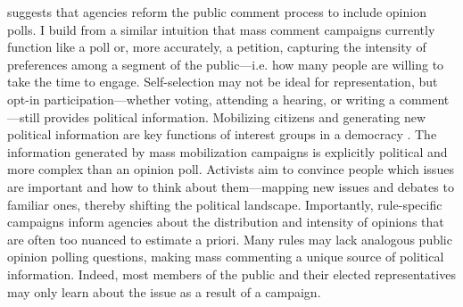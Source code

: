 \citet{Rauch2016} suggests that agencies reform the public comment process to include opinion polls. I build from a similar intuition that mass comment campaigns currently function like a poll or, more accurately, a petition, capturing the intensity of preferences among a segment of the public---i.e. how many people are willing to take the time to engage. Self-selection may not be ideal for representation, but opt-in participation---whether voting, attending a hearing, or writing a comment---still provides political information. 
Mobilizing citizens and generating new political information are key functions of interest groups in a democracy \citep{Mansbridge1992, Mahoney2007}. The information generated by mass mobilization campaigns is explicitly political and more complex than an opinion poll. Activists aim to convince people which issues are important and how to think about them---mapping new issues and debates to familiar ones, thereby shifting the political landscape. Importantly, rule-specific campaigns inform agencies about the distribution and intensity of opinions that are often too nuanced to estimate a priori. Many rules may lack analogous public opinion polling questions, making mass commenting a unique source of political information. Indeed, most members of the public and their elected representatives may only learn about the issue as a result of a campaign.

















